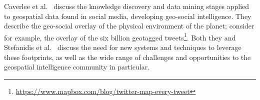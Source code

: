 \documentclass[conference]{IEEEtran}
\begin{document}
Caverlee et al.~\cite{caverlee-et-al:2013} discuss the knowledge
discovery and data mining stages applied to geospatial data found in
social media, developing geo-social intelligence. They describe the
geo-social overlay of the physical environment of the planet; consider
for example, the overlay of the six billion geotagged
tweets\footnote{\url{https://www.mapbox.com/blog/twitter-map-every-tweet}}. Both
they and Stefanidis et al.~\cite{stefanidis-et-al:2014} discuss the
need for new systems and techniques to leverage these footprints, as
well as the wide range of challenges and opportunities to the
geospatial intelligence community in particular.









\end{document}
